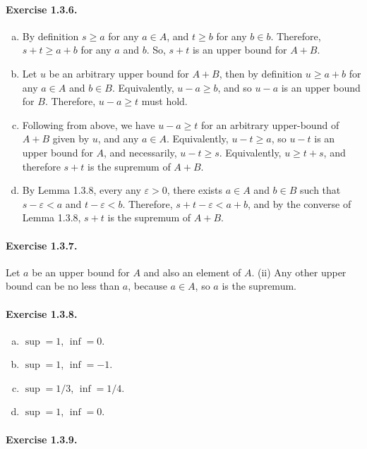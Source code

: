 \documentclass{article}
\begin{document}
\paragraph{Exercise 1.3.6.}
\begin{enumerate}[(a)]
    \item By definition $s \geq a$ for any $a \in A$, and $t \geq b$ for any $b \in b$. Therefore, $s + t \geq a + b$ for any $a$ and $b$. So, $s+t$ is an upper bound for $A + B$.
    \item Let $u$ be an arbitrary upper bound for $A+B$, then by definition $u \geq a+b$ for any $a\in A$ and $b\in B$. Equivalently, $u-a \geq b$, and so $u-a$ is an upper bound for $B$. Therefore, $u-a \geq t$ must hold.
    \item Following from above, we have $u-a\geq t$ for an arbitrary upper-bound of $A+B$ given by $u$, and any $a \in A$. Equivalently, $u-t\geq a$, so $u-t$ is an upper bound for $A$, and necessarily, $u-t\geq s$. Equivalently, $u\geq t+s$, and therefore $s+t$ is the supremum of $A+B$.
    \item By Lemma 1.3.8, every any $\varepsilon > 0$, there exists $a\in A$ and $b \in B$ such that $s-\varepsilon < a$ and $t-\varepsilon < b$. Therefore, $s+t-\varepsilon < a+b$, and by the converse of Lemma 1.3.8, $s+t$ is the supremum of $A+B$.
\end{enumerate}

\paragraph{Exercise 1.3.7.}
Let $a$ be an upper bound for $A$ and also an element of $A$. (ii) Any other upper bound can be no less than $a$, because $a \in A$, so $a$ is the supremum.

\paragraph{Exercise 1.3.8.}
\begin{enumerate}[(a)]
    \item $\sup = 1$, $\inf = 0$.
    \item $\sup=1$, $\inf=-1$.
    \item $\sup=1/3$, $\inf=1/4$.
    \item $\sup=1$, $\inf = 0$.
\end{enumerate}


\paragraph{Exercise 1.3.9.}
\end{document}

